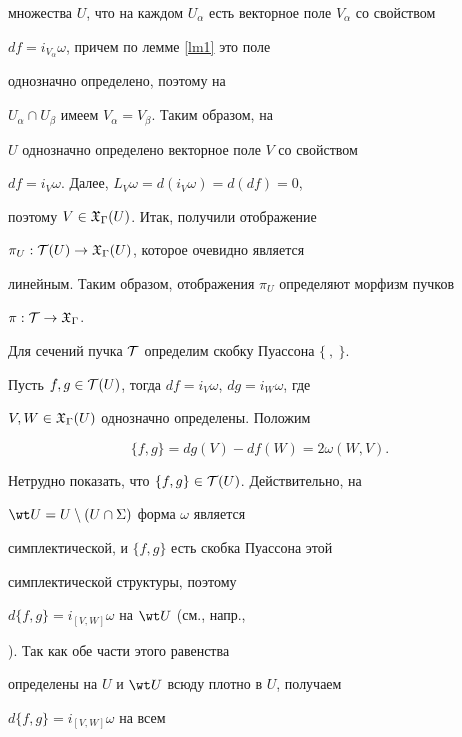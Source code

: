 множества $U$, что на каждом $U_\alpha$ есть векторное поле $


V_\alpha$ со свойством


$ df = i_{V_\alpha}\omega$, причем по лемме \ref{lm1} это поле


однозначно определено, поэтому  на


$ U_\alpha \cap U_\beta$ имеем $ V_\alpha = V_\beta$. Таким образом, на


$U$ однозначно определено векторное поле $ V$ со свойством


$df =i_V\omega$. Далее, $L_V\omega = d(i_V \omega) = d(df) = 0$,


поэтому $V \in {\frak X}_\Gamma(U)$. Итак, получили отображение


$\pi_U : {\cal T}(U) \to {\frak X}_\Gamma(U)$, которое очевидно является


линейным. Таким образом, отображения $\pi_U$ определяют морфизм пучков


$\pi :  {\cal T} \to {\frak X}_\Gamma$.








Для сечений пучка ${\cal T}$ определим скобку Пуассона $ \{\ ,\ \}$.


Пусть $f,g \in {\cal T}(U)$, тогда $df=i_V\omega$, $dg=i_W\omega$, где


$V, W \in {\frak X}_\Gamma(U)$ однозначно определены. Положим


\begin{equation}\label{eq13}


\{f,g\} = dg(V) - df(W) = 2 \omega(W,V).


\end{equation}





Нетрудно показать, что $\{f,g\} \in {\cal T}(U)$. Действительно,  на


$\wt U = U \setminus (U \cap \Sigma)$ форма $\omega$ является


симплектической, и $\{f,g\}$ есть скобка Пуассона этой


симплектической структуры, поэтому


$d \{f,g\} = i_{[V,W]}\omega$ на $\wt U$ (см., напр.,


\cite{Fomenko}). Так как обе части этого равенства


определены на $U$ и $\wt U$ всюду плотно в $U$, получаем


$d \{f,g\} = i_{[V,W]}\omega$ на всем


